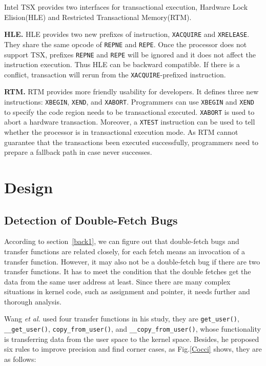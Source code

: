 \documentclass[10pt]{llncs}
\begin{document}
Intel TSX provides two interfaces for transactional execution, Hardware Lock Elision(HLE) and Restricted Transactional Memory(RTM).

\textbf{HLE.} HLE provides two new prefixes of instruction, \verb:XACQUIRE: and \verb:XRELEASE:. They share the same opcode of \verb:REPNE: and \verb:REPE:. Once the processor does not support TSX, prefixes \verb:REPNE: and \verb:REPE: will be ignored and it does not affect the instruction execution. Thus HLE can be backward compatible. If there is a conflict, transaction will rerun from the \verb:XACQUIRE:-prefixed instruction.

\textbf{RTM.} RTM provides more friendly usability for developers. It defines three new instructions: \verb:XBEGIN:, \verb:XEND:, and \verb:XABORT:. Programmers can use \verb:XBEGIN: and \verb:XEND: to specify the code region needs to be transactional executed. \verb:XABORT: is used to abort a hardware transaction. Moreover, a \verb:XTEST: instruction can be used to tell whether the processor is in transactional execution mode. As RTM cannot guarantee that the transactions been executed successfully, programmers need to prepare a fallback path in case never successes.

\section{Design}%
\label{design}

\subsection{Detection of Double-Fetch Bugs}
\label{design1}
According to section~\ref{back1}, we can figure out that double-fetch bugs and transfer functions are related closely, for each fetch means an invocation of a transfer function. However, it may also not be a double-fetch bug if there are two transfer functions. It has to meet the condition that the double fetches get the data from the same user address at least. Since there are many complex situations in kernel code, such as assignment and pointer, it needs further and thorough analysis.

Wang \textit{et al.} used four transfer functions in his study, they are \verb:get_user():, \verb:__get_user():, \verb:copy_from_user():, and \verb:__copy_from_user():, whose functionality is transferring data from the user space to the kernel space. Besides, he proposed six rules to improve precision and find corner cases, as Fig.\ref{Cocci} shows, they are as follows:
\end{document}
